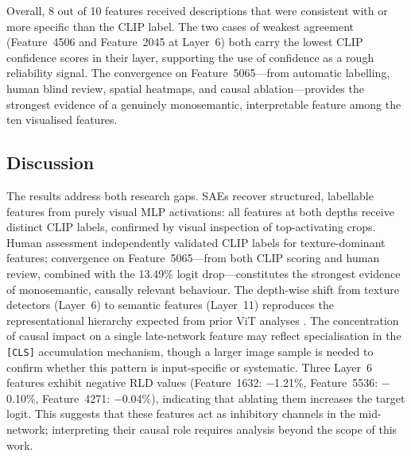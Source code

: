 Overall, 8 out of 10 features received descriptions that were consistent with or more specific than the CLIP label. The two cases of weakest agreement (Feature~4506 and Feature~2045 at Layer~6) both carry the lowest CLIP confidence scores in their layer, supporting the use of confidence as a rough reliability signal. The convergence on Feature~5065---from automatic labelling, human blind review, spatial heatmaps, and causal ablation---provides the strongest evidence of a genuinely monosemantic, interpretable feature among the ten visualised features.

\subsection{Discussion}

The results address both research gaps. SAEs recover structured, labellable features from purely visual MLP activations: all features at both depths receive distinct CLIP labels, confirmed by visual inspection of top-activating crops. Human assessment independently validated CLIP labels for texture-dominant features; convergence on Feature~5065---from both CLIP scoring and human review, combined with the 13.49\% logit drop---constitutes the strongest evidence of monosemantic, causally relevant behaviour. The depth-wise shift from texture detectors (Layer~6) to semantic features (Layer~11) reproduces the representational hierarchy expected from prior ViT analyses \cite{Raghu2021}. The concentration of causal impact on a single late-network feature may reflect specialisation in the \texttt{[CLS]} accumulation mechanism, though a larger image sample is needed to confirm whether this pattern is input-specific or systematic. Three Layer~6 features exhibit negative RLD values (Feature~1632: $-$1.21\%, Feature~5536: $-$0.10\%, Feature~4271: $-$0.04\%), indicating that ablating them increases the target logit. This suggests that these features act as inhibitory channels in the mid-network; interpreting their causal role requires analysis beyond the scope of this work.
